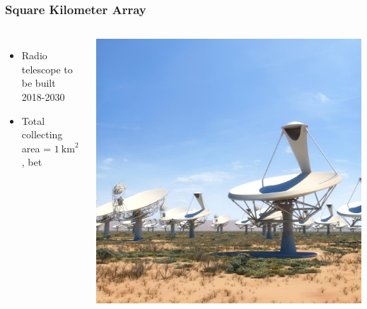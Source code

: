 \documentclass[10pt, compress]{beamer}
\begin{document}
\begin{frame}[fragile]
    \frametitle{Square Kilometer Array}
    \begin{columns}
            \begin{itemize}
                \item Radio telescope to be built 2018-2030
                \item Total collecting area = $1~\mathrm{km}^2$, bet
            \end{itemize}
            \includegraphics[width=\textheight]{assets/ska_dish_mid_africa_closeup.jpg}
    \end{columns}
\end{frame}
\end{document}
